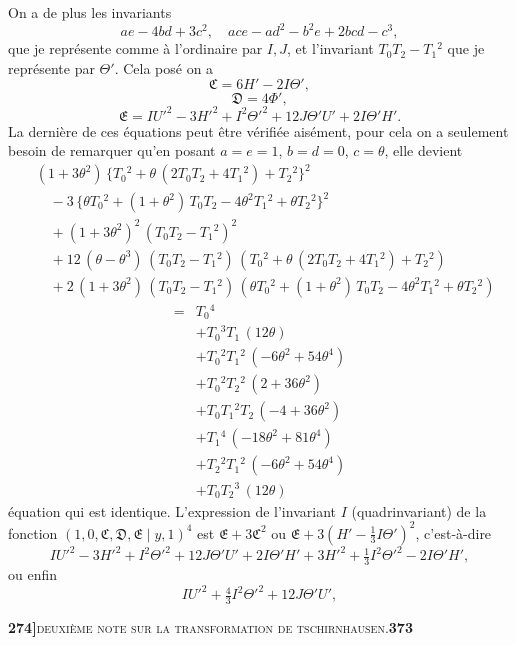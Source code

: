\documentclass[11pt]{article}
\newcommand{\Cdel}{\mid}
\begin{document}
\medskip

On a de plus les invariants
\[
ae - 4 bd + 3 c^2,\quad ace - ad^2 - b^2 e + 2 bcd - c^3,
\]
que je repr\'esente comme \`a l'ordinaire par $I, J$, et l'invariant $T_0 T_2 - T_1{}^2$ que je repr\'esente par $\Theta'$. Cela pos\'e on a
\[
\mathfrak{C} = 6 H' - 2 I \Theta',
\]
\[
\mathfrak{D} = 4 \Phi',
\]
\[
\mathfrak{E} = I U'^2 - 3 H'^2 + I^2 \Theta'^2 + 12 J \Theta' U' + 2 I \Theta' H'.
\]
La derni\`ere de ces \'equations peut \^etre v\'erifi\'ee ais\'ement, pour cela on a seulement besoin de remarquer qu'en posant $a = e = 1$, $b = d = 0$, $c = \theta$, elle devient
\[
\begin{aligned}
&(1 + 3\theta^2)\,\{T_0{}^2 + \theta\,(2 T_0 T_2 + 4 T_1{}^2) + T_2{}^2\}^2 \\
&\quad - 3\,\{\theta T_0{}^2 + (1 + \theta^2)\, T_0 T_2 - 4 \theta^2 T_1{}^2 + \theta T_2{}^2\}^2 \\
&\quad + (1 + 3\theta^2)^2\,(T_0 T_2 - T_1{}^2)^2 \\
&\quad + 12\,(\theta - \theta^3)\,(T_0 T_2 - T_1{}^2)\,(T_0{}^2 + \theta\,(2 T_0 T_2 + 4 T_1{}^2) + T_2{}^2) \\
&\quad + 2\,(1 + 3\theta^2)\,(T_0 T_2 - T_1{}^2)\,(\theta T_0{}^2 + (1 + \theta^2)\, T_0 T_2 - 4 \theta^2 T_1{}^2 + \theta T_2{}^2)
\end{aligned}
\]
\[
\begin{aligned}
={}& T_0{}^4 \\
& + T_0{}^3 T_1\,(12 \theta) \\
& + T_0{}^2 T_1{}^2\,(-6 \theta^2 + 54 \theta^4) \\
& + T_0{}^2 T_2{}^2\,(2 + 36 \theta^2) \\
& + T_0 T_1{}^2 T_2\,(-4 + 36 \theta^2) \\
& + T_1{}^4\,(-18 \theta^2 + 81 \theta^4) \\
& + T_2{}^2 T_1{}^2\,(-6 \theta^2 + 54 \theta^4) \\
& + T_0 T_2{}^3\,(12 \theta)
\end{aligned}
\]
\'equation qui est identique. L'expression de l'invariant $I$ (quadrinvariant) de la fonction $(1, 0, \mathfrak{C}, \mathfrak{D}, \mathfrak{E} \Cdel y, 1)^4$ est $\mathfrak{E} + 3 \mathfrak{C}^2$ ou $\mathfrak{E} + 3(H' - \tfrac{1}{3} I \Theta')^2$, c'est-\`a-dire
\[
I U'^2 - 3 H'^2 + I^2 \Theta'^2 + 12 J \Theta' U' + 2 I \Theta' H' + 3 H'^2 + \tfrac{1}{3} I^2 \Theta'^2 - 2 I \Theta' H',
\]
ou enfin
\[
I U'^2 + \tfrac{4}{3} I^2 \Theta'^2 + 12 J \Theta' U',
\]

\newpage
\noindent\textbf{274]}\hfill\textsc{deuxi\`eme note sur la transformation de tschirnhausen.}\hfill\textbf{373}
\end{document}
